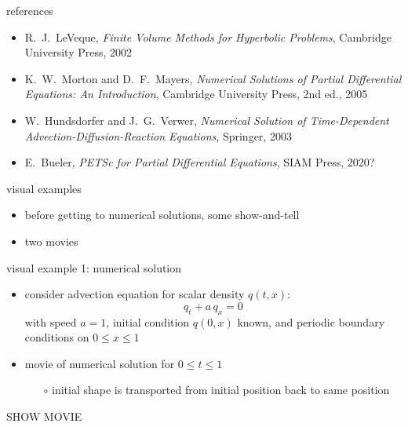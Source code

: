 \documentclass[10pt,hyperref]{beamer}
\begin{document}
\begin{frame}{references}
\begin{itemize}
\item {\large \alert{R.~J.~LeVeque, \emph{Finite Volume Methods for Hyperbolic Problems}, Cambridge University Press, 2002}}

\bigskip
\item K.~W.~Morton and D.~F.~Mayers, \emph{Numerical Solutions of Partial Differential Equations: An Introduction}, Cambridge University Press, 2nd ed., 2005
\item W.~Hundsdorfer and J.~G.~Verwer, \emph{Numerical Solution of Time-Dependent Advection-Diffusion-Reaction Equations}, Springer, 2003
\item E.~Bueler, \emph{PETSc for Partial Differential Equations}, SIAM Press, 2020?
\end{itemize}
\end{frame}


\begin{frame}{visual examples}

\begin{itemize}
\item before getting to numerical solutions, some show-and-tell
\item two movies
\end{itemize}
\end{frame}


\begin{frame}{visual example 1: numerical solution}

\begin{itemize}
\item consider advection equation for scalar density $q(t,x)$:
    $$q_t + a \, q_x = 0$$
with speed $a=1$, initial condition $q(0,x)$ known, and periodic boundary conditions on $0\le x \le 1$
\item movie of numerical solution for $0\le t \le 1$
    \begin{itemize}
    \item[$\circ$] initial shape is transported from initial position back to same position
    \end{itemize}
\end{itemize}

\vspace{10mm}
\begin{center}
\alert{SHOW MOVIE}
\end{center}
\vspace{10mm}

\end{frame}
\end{document}
